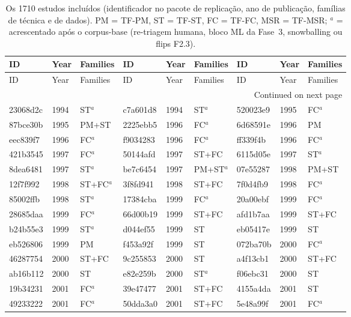 \scriptsize
\setlength{\tabcolsep}{2.5pt}
\begin{longtable}{lll@{\hspace{10pt}}lll@{\hspace{10pt}}lll}
\caption{Os 1710 estudos incluídos (identificador no pacote de replicação, ano de publicação, famílias de técnica e de dados). PM = TF-PM, ST = TF-ST, FC = TF-FC, MSR = TF-MSR; $^{a}$ = acrescentado após o corpus-base (re-triagem humana, bloco ML da Fase~3, snowballing ou flips F2.3).}\label{tab:studies}\\
\toprule
ID & Year & Families & ID & Year & Families & ID & Year & Families \\
\midrule
\endfirsthead
\toprule
ID & Year & Families & ID & Year & Families & ID & Year & Families \\
\midrule
\endhead
\midrule
\multicolumn{9}{r}{Continued on next page}\\
\endfoot
\bottomrule
\endlastfoot
23068d2c & 1994 & ST$^{a}$ & c7a601d8 & 1994 & ST$^{a}$ & 520023e9 & 1995 & FC$^{a}$ \\
87bce30b & 1995 & PM+ST & 2225ebb5 & 1996 & FC$^{a}$ & 6d68591e & 1996 & PM \\
eec839f7 & 1996 & FC$^{a}$ & f9034283 & 1996 & FC$^{a}$ & ff339f4b & 1996 & FC$^{a}$ \\
421b3545 & 1997 & FC$^{a}$ & 50144afd & 1997 & ST+FC & 6115d05e & 1997 & ST$^{a}$ \\
8dea6481 & 1997 & ST$^{a}$ & be7c6454 & 1997 & PM+ST$^{a}$ & 07e55287 & 1998 & PM+ST \\
12f7f992 & 1998 & ST+FC$^{a}$ & 3f8fd941 & 1998 & ST+FC & 7f0d4fb9 & 1998 & FC$^{a}$ \\
85002ffb & 1998 & ST$^{a}$ & 17384cba & 1999 & FC$^{a}$ & 20a00ebf & 1999 & FC$^{a}$ \\
28685daa & 1999 & FC$^{a}$ & 66d00b19 & 1999 & ST+FC & afd1b7aa & 1999 & ST+FC \\
b24b55e3 & 1999 & ST$^{a}$ & d044ef55 & 1999 & ST & eb05417e & 1999 & ST \\
eb526806 & 1999 & PM & f453a92f & 1999 & ST & 072ba70b & 2000 & FC$^{a}$ \\
46287754 & 2000 & ST+FC & 9c255853 & 2000 & ST & a4f13cb1 & 2000 & ST+FC \\
ab16b112 & 2000 & ST & e82e259b & 2000 & ST$^{a}$ & f06ebc31 & 2000 & ST \\
19b34231 & 2001 & FC$^{a}$ & 39e47477 & 2001 & ST+FC & 4155a4da & 2001 & ST \\
49233222 & 2001 & FC$^{a}$ & 50dda3a0 & 2001 & ST+FC & 5e48a99f & 2001 & FC$^{a}$ \\

\end{longtable}
